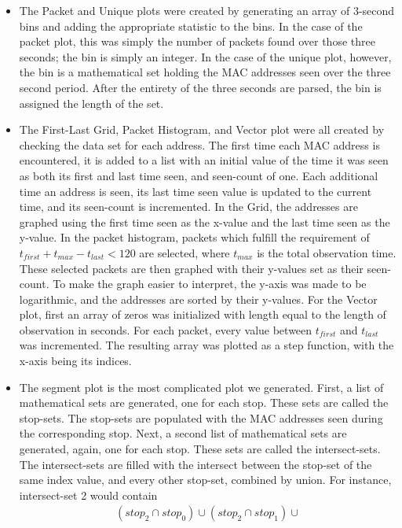 \begin{itemize}
\item The Packet and Unique plots were created by generating an array of 3-second bins and adding the appropriate statistic to the bins.
  In the case of the packet plot, this was simply the number of packets found over those three seconds; the bin is simply an integer.
  In the case of the unique plot, however, the bin is a mathematical set holding the MAC addresses seen over the three second period.
  After the entirety of the three seconds are parsed, the bin is assigned the length of the set.
\item The First-Last Grid, Packet Histogram, and Vector plot were all created by checking the data set for each address.
  The first time each MAC address is encountered, it is added to a list with an initial value of the time it was seen as both its first and last time seen, and seen-count of one.
  Each additional time an address is seen, its last time seen value is updated to the current time, and its seen-count is incremented.
  In the Grid, the addresses are graphed using the first time seen as the x-value and the last time seen as the y-value.
  In the packet histogram, packets which fulfill the requirement of \(t_{first} + t_{max} - t_{last} < 120\) are selected, where \(t_{max}\) is the total observation time.
  These selected packets are then graphed with their y-values set as their seen-count.
  To make the graph easier to interpret, the y-axis was made to be logarithmic, and the addresses are sorted by their y-values.
  For the Vector plot, first an array of zeros was initialized with length equal to the length of observation in seconds.
  For each packet, every value between \(t_{first}\) and \(t_{last}\) was incremented.
  The resulting array was plotted as a step function, with the x-axis being its indices.
\item The segment plot is the most complicated plot we generated.
  First, a list of mathematical sets are generated, one for each stop.
  These sets are called the stop-sets.
  The stop-sets are populated with the MAC addresses seen during the corresponding stop.
  Next, a second list of mathematical sets are generated, again, one for each stop.
  These sets are called the intersect-sets.
  The intersect-sets are filled with the intersect between the stop-set of the same index value, and every other stop-set, combined by union.
  For instance, intersect-set 2 would contain
  \begin{multline*}
    \left(stop_2 \cap stop_0\right) \cup \left(stop_2 \cap stop_1\right) \cup \\

\end{multline*}
\end{itemize}
